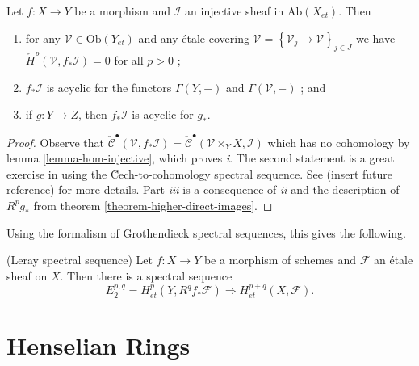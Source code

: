 \begin{lemma}
\label{lemma-prepare-leray}
Let $f: X\to Y$ be a morphism and $\mathcal{I}$ an injective sheaf in
$\text{Ab}(X_{et})$. Then
\begin{enumerate}
\item
for any $\mathcal{V}\in\text{Ob}(Y_{et})$ and any \'etale covering
$\mathcal{V}=\left\{\mathcal{V}_j\to \mathcal{V}\right\}_{j\in J}$ we have
$\check H^p(\mathcal{V}, f_*\mathcal{I}) = 0$ for all $p>0$ ;
\item
$f_*\mathcal{I}$ is acyclic for the functors $\Gamma(Y, -)$ and
$\Gamma(\mathcal{V},-)$ ; and
\item
if $g: Y\to Z$, then $f_*\mathcal{I}$ is acyclic for $g_*$.
\end{enumerate}
\end{lemma}

\begin{proof}
Observe that $\check{\mathcal{C}}^\bullet(\mathcal{V}, f_*\mathcal{I}) =
\check{\mathcal{C}}^\bullet(\mathcal{V}\times_Y X, \mathcal{I})$ which has no
cohomology by lemma \ref{lemma-hom-injective}, which proves {\it i}. The
second statement is a great exercise in using the \u Cech-to-cohomology
spectral sequence. See (insert future reference) for more details. Part {\it
iii} is a consequence of {\it ii} and the description of $R^pg_*$ from theorem
\ref{theorem-higher-direct-images}.
\end{proof}

\noindent
Using the formalism of Grothendieck spectral sequences, this gives the
following.

\begin{proposition}
\label{proposition-leray}
(Leray spectral sequence)
Let $f: X \to Y$ be a morphism of schemes and $\mathcal{F}$ an \'etale sheaf on
$X$. Then there is a spectral sequence
$$
E_2^{p,q} = H_{et}^p(Y, R^qf_*\mathcal{F}) \Rightarrow H_{et}^{p+q}(X,
\mathcal{F}).
$$
\end{proposition}





\section{Henselian Rings}
\label{section-heselian-ring}


